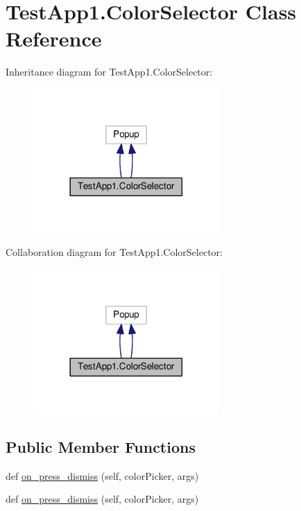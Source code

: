 \hypertarget{classTestApp1_1_1ColorSelector}{}\section{Test\+App1.\+Color\+Selector Class Reference}
\label{classTestApp1_1_1ColorSelector}


Inheritance diagram for Test\+App1.\+Color\+Selector\+:
\nopagebreak
\begin{figure}[H]
\begin{center}
\leavevmode
\includegraphics[width=201pt]{classTestApp1_1_1ColorSelector__inherit__graph}
\end{center}
\end{figure}


Collaboration diagram for Test\+App1.\+Color\+Selector\+:
\nopagebreak
\begin{figure}[H]
\begin{center}
\leavevmode
\includegraphics[width=201pt]{classTestApp1_1_1ColorSelector__coll__graph}
\end{center}
\end{figure}
\subsection*{Public Member Functions}
\begin{DoxyCompactItemize}
\item 
def \hyperlink{classTestApp1_1_1ColorSelector_afcecec797d6c063981dd5c29a6b876a3}{on\+\_\+press\+\_\+dismiss} (self, color\+Picker, args)
\item 
def \hyperlink{classTestApp1_1_1ColorSelector_afcecec797d6c063981dd5c29a6b876a3}{on\+\_\+press\+\_\+dismiss} (self, color\+Picker, args)
\end{DoxyCompactItemize}


